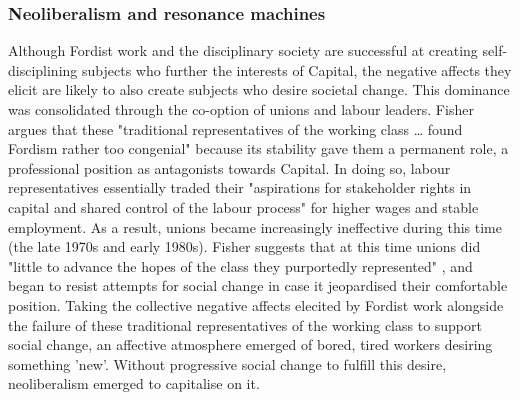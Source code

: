 
\subsubsection{Neoliberalism and resonance machines}
\label{neoliberalism-and-resonance-machines}

Although Fordist work and the disciplinary society are successful at creating self-disciplining subjects who further the interests of Capital, the negative affects they elicit are likely to also create subjects who desire societal change. This dominance was consolidated through the co-option of unions and labour leaders. Fisher argues that these "traditional representatives of the working class \ldots{} found Fordism rather too congenial" \citep[38]{fisher_capitalist_2009} because its stability gave them a permanent role, a professional position as antagonists towards Capital. In doing so, labour representatives essentially traded their "aspirations for stakeholder rights in capital and shared control of the labour process"   \citep[37]{antonio_new_2000} for higher wages and stable employment. As a result, unions became increasingly ineffective during this time (the late 1970s and early 1980s). Fisher suggests that at this time unions did "little to advance the hopes of the class they purportedly represented" \citep[38]{fisher_capitalist_2009}, and began to resist attempts for social change in case it jeopardised their comfortable position. Taking the collective negative affects elecited by Fordist work alongside the failure of these traditional representatives of the working class to support social change, an affective atmosphere emerged of bored, tired workers desiring something 'new'. Without progressive social change to fulfill this desire, neoliberalism emerged to capitalise on it.

